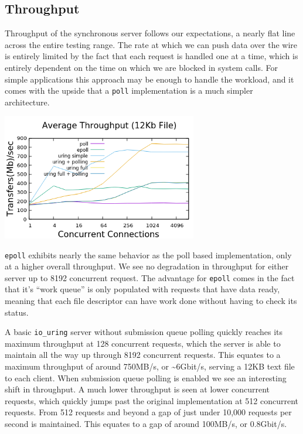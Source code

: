 \documentclass[letterpaper, 10pt, twocolumn]{article}
\begin{document}
\subsection{Throughput}
\label{sec:org7809b1d}
Throughput of the synchronous server follows our expectations, a nearly flat line across the entire testing range. The rate at which we can push data over the wire is entirely limited by the fact that each request is handled one at a time, which is entirely dependent on the time on which we are blocked in system calls. For simple applications this approach may be enough to handle the workload, and it comes with the upside that a \texttt{poll} implementation is a much simpler architecture.

\begin{center}
\includegraphics[width=3.35in]{med_throughput.png}
\end{center}

\texttt{epoll} exhibits nearly the same behavior as the poll based implementation, only at a higher overall throughput. We see no degradation in throughput for either server up to 8192 concurrent request. The advantage for \texttt{epoll} comes in the fact that it's ``work queue'' is only populated with requests that have data ready, meaning that each file descriptor can have work done without having to check its status.

A basic \texttt{io\_uring} server without submission queue polling quickly reaches its maximum throughput at 128 concurrent requests, which the server is able to maintain all the way up through 8192 concurrent requests. This equates to a maximum throughput of around 750MB/s, or \textasciitilde{}6Gbit/s, serving a 12KB text file to each client. When submission queue polling is enabled we see an interesting shift in throughput. A much lower throughput is seen at lower concurrent requests, which quickly jumps past the original implementation at 512 concurrent requests. From 512 requests and beyond a gap of just under 10,000 requests per second is maintained. This equates to a gap of around 100MB/s, or 0.8Gbit/s.
\end{document}
